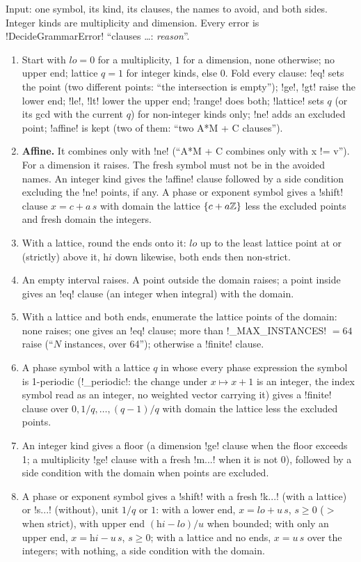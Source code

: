 \begin{algorithm}\label{alg:semantics-plan-clauses}
Input: one symbol, its kind, its clauses, the names to avoid, and both sides. Integer kinds are multiplicity and dimension. Every error is \py!DecideGrammarError! ``clauses \ldots: \textit{reason}''.
\begin{enumerate}
\item Start with $\textit{lo}=0$ for a multiplicity, $1$ for a dimension, none otherwise; no upper end; lattice $q=1$ for integer kinds, else $0$. Fold every clause: \code!eq! sets the point (two different points: ``the intersection is empty''); \code!ge!, \code!gt! raise the lower end; \code!le!, \code!lt! lower the upper end; \code!range! does both; \code!lattice! sets $q$ (or its gcd with the current $q$) for non-integer kinds only; \code!ne! adds an excluded point; \code!affine! is kept (two of them: ``two A*M + C clauses'').
\item \textbf{Affine.} It combines only with \code!ne! (``A*M + C combines only with x != v''). For a dimension it raises. The fresh symbol must not be in the avoided names. An integer kind gives the \code!affine! clause followed by a side condition excluding the \code!ne! points, if any. A phase or exponent symbol gives a \code!shift! clause $x=c+a\,s$ with domain the lattice $\{c+a\mathbb{Z}\}$ less the excluded points and fresh domain the integers.
\item With a lattice, round the ends onto it: $\textit{lo}$ up to the least lattice point at or (strictly) above it, $\textit{hi}$ down likewise, both ends then non-strict.
\item An empty interval raises. A point outside the domain raises; a point inside gives an \code!eq! clause (an integer when integral) with the domain.
\item With a lattice and both ends, enumerate the lattice points of the domain: none raises; one gives an \code!eq! clause; more than \py!_MAX_INSTANCES! $=64$ raise (``$N$ instances, over 64''); otherwise a \code!finite! clause.
\item A phase symbol with a lattice $q$ in whose every phase expression the symbol is 1-periodic (\py!_periodic!: the change under $x\mapsto x+1$ is an integer, the index symbol read as an integer, no weighted vector carrying it) gives a \code!finite! clause over $0,1/q,\dots,(q-1)/q$ with domain the lattice less the excluded points.
\item An integer kind gives a floor (a dimension \code!ge! clause when the floor exceeds 1; a multiplicity \code!ge! clause with a fresh \code!m...! when it is not 0), followed by a side condition with the domain when points are excluded.
\item A phase or exponent symbol gives a \code!shift! with a fresh \code!k...! (with a lattice) or \code!s...! (without), unit $1/q$ or $1$: with a lower end, $x=\textit{lo}+u\,s$, $s\ge0$ ($>$ when strict), with upper end $(\textit{hi}-\textit{lo})/u$ when bounded; with only an upper end, $x=\textit{hi}-u\,s$, $s\ge 0$; with a lattice and no ends, $x=u\,s$ over the integers; with nothing, a side condition with the domain.
\end{enumerate}
\end{algorithm}

